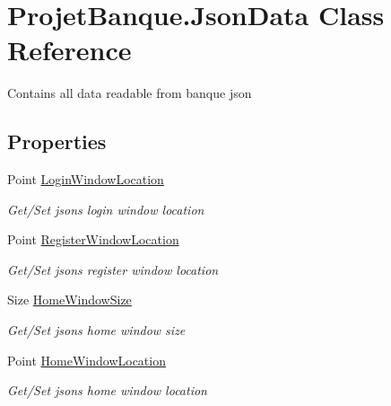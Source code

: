 \hypertarget{class_projet_banque_1_1_json_data}{}\section{Projet\+Banque.\+Json\+Data Class Reference}
\label{class_projet_banque_1_1_json_data}


Contains all data readable from banque json  


\subsection*{Properties}
\begin{DoxyCompactItemize}
\item 
Point \mbox{\hyperlink{class_projet_banque_1_1_json_data_af8ffa0c2abc32d48243dc8f19677e61d}{Login\+Window\+Location}}
\begin{DoxyCompactList}\small\item\em Get/\+Set json\textquotesingle{}s login window location \end{DoxyCompactList}\item 
Point \mbox{\hyperlink{class_projet_banque_1_1_json_data_ae2055a1365e1c285dfcbf4b5c4b28375}{Register\+Window\+Location}}
\begin{DoxyCompactList}\small\item\em Get/\+Set json\textquotesingle{}s register window location \end{DoxyCompactList}\item 
Size \mbox{\hyperlink{class_projet_banque_1_1_json_data_a24bc6496b60aafa2736bcb85c695e675}{Home\+Window\+Size}}
\begin{DoxyCompactList}\small\item\em Get/\+Set json\textquotesingle{}s home window size \end{DoxyCompactList}\item 
Point \mbox{\hyperlink{class_projet_banque_1_1_json_data_a089eed85f18984553c62acfb0c362f06}{Home\+Window\+Location}}
\begin{DoxyCompactList}\small\item\em Get/\+Set json\textquotesingle{}s home window location \end{DoxyCompactList}\end{DoxyCompactItemize}


